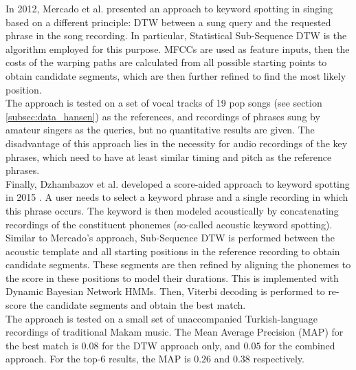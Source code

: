 In 2012, Mercado et al. presented an approach to keyword spotting in singing based on a different principle: DTW between a sung query and the requested phrase in the song recording. In particular, Statistical Sub-Sequence DTW is the algorithm employed for this purpose. MFCCs are used as feature inputs, then the costs of the warping paths are calculated from all possible starting points to obtain candidate segments, which are then further refined to find the most likely position.\\
The approach is tested on a set of vocal tracks of 19 pop songs (see section \ref{subsec:data_hansen}) as the references, and recordings of phrases sung by amateur singers as the queries, but no quantitative results are given. The disadvantage of this approach lies in the necessity for audio recordings of the key phrases, which need to have at least similar timing and pitch as the reference phrases.\\

Finally, Dzhambazov et al. developed a score-aided approach to keyword spotting in 2015 \cite{dzhambazov_ismir}. A user needs to select a keyword phrase and a single recording in which this phrase occurs. The keyword is then modeled acoustically by concatenating recordings of the constituent phonemes (so-called acoustic keyword spotting). Similar to Mercado's approach, Sub-Sequence DTW is performed between the acoustic template and all starting positions in the reference recording to obtain candidate segments. These segments are then refined by aligning the phonemes to the score in these positions to model their durations. This is implemented with Dynamic Bayesian Network HMMs. Then, Viterbi decoding is performed to re-score the candidate segments and obtain the best match.\\
The approach is tested on a small set of unaccompanied Turkish-language recordings of traditional Makam music. The Mean Average Precision (MAP) for the best match is $0.08$ for the DTW approach only, and $0.05$ for the combined approach. For the top-6 results, the MAP is $0.26$ and $0.38$ respectively.


